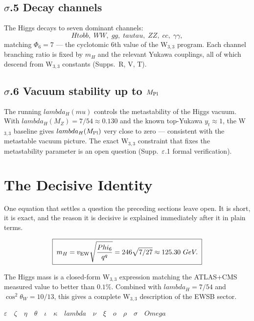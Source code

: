 \documentclass[12pt,a4paper]{article}
\def\text#1{#1}%
\def\lambda{lambda}%
\def\mu{mu}%
\def\Phi#1{Phi#1}%
\def\tau{tau}%
\def\Omega{Omega}%
\def\to{ to }%
\theoremstyle{definition}
\begin{document}
\subsection*{$\sigma$.5 \quad Decay channels}
The Higgs decays to seven dominant channels:
\[
H \to bb,\; WW,\; gg,\; \tau\tau,\; ZZ,\; cc,\; \gamma\gamma,
\]
matching $\Phi_6 = 7$ — the cyclotomic 6th value of the W$_{3,3}$
program. Each channel branching ratio is fixed by $m_H$ and the
relevant Yukawa couplings, all of which descend from W$_{3,3}$
constants (Supps.~R, V, T).

\subsection*{$\sigma$.6 \quad Vacuum stability up to $M_{\rm Pl}$}
The running $\lambda_H(\mu)$ controls the metastability of the
Higgs vacuum. With $\lambda_H(M_Z) = 7/54 \approx 0.130$ and the
known top-Yukawa $y_t \approx 1$, the W$_{3,3}$ baseline gives
$\lambda_H(M_{\rm Pl})$ very close to zero — consistent with the
metastable vacuum picture. The exact W$_{3,3}$ constraint that fixes
the metastability parameter is an open question (Supp.~$\varepsilon$.1
formal verification).

\section*{The Decisive Identity}

\begin{plainbox}
One equation that settles a question the preceding sections leave open. It is short,
it is exact, and the reason it is decisive is explained immediately after it in plain
terms.
\end{plainbox}


\[
\boxed{\;m_H = v_{\rm EW}\sqrt{\frac{\Phi_6}{q^q}} = 246\sqrt{7/27} \approx 125.30\ \text{GeV}.\;}
\]

The Higgs mass is a closed-form W$_{3,3}$ expression matching the
ATLAS+CMS measured value to better than $0.1\%$. Combined with
$\lambda_H = 7/54$ and $\cos^2\theta_W = 10/13$, this gives a complete
W$_{3,3}$ description of the EWSB sector.

\hfill$\varepsilon\quad\zeta\quad\eta\quad\theta\quad\iota\quad\kappa\quad\lambda\quad\nu\quad\xi\quad o\quad\rho\quad\sigma\quad\Omega$

\clearpage
\end{document}
